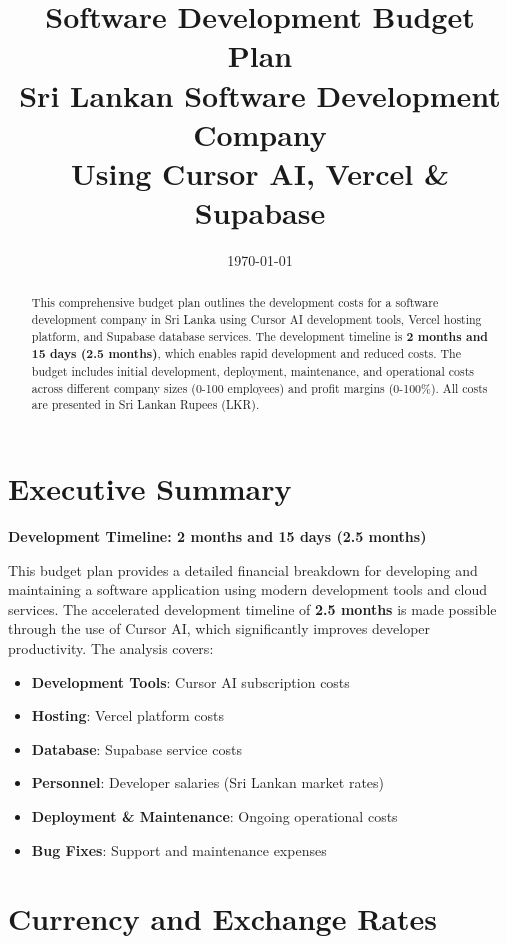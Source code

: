 \documentclass[12pt,a4paper]{article}
\title{\vspace{-2cm}\Huge\textbf{Software Development Budget Plan}\\
\Large Sri Lankan Software Development Company\\
\large Using Cursor AI, Vercel \& Supabase\vspace{0.5cm}}
\author{}
\date{\today}
\begin{document}
\maketitle
\thispagestyle{fancy}

\begin{abstract}
This comprehensive budget plan outlines the development costs for a software development company in Sri Lanka using Cursor AI development tools, Vercel hosting platform, and Supabase database services. The development timeline is \textbf{2 months and 15 days (2.5 months)}, which enables rapid development and reduced costs. The budget includes initial development, deployment, maintenance, and operational costs across different company sizes (0-100 employees) and profit margins (0-100\%). All costs are presented in Sri Lankan Rupees (LKR).
\end{abstract}

\tableofcontents
\newpage

\section{Executive Summary}

\textbf{Development Timeline: 2 months and 15 days (2.5 months)}

This budget plan provides a detailed financial breakdown for developing and maintaining a software application using modern development tools and cloud services. The accelerated development timeline of \textbf{2.5 months} is made possible through the use of Cursor AI, which significantly improves developer productivity. The analysis covers:

\begin{itemize}
    \item \textbf{Development Tools}: Cursor AI subscription costs
    \item \textbf{Hosting}: Vercel platform costs
    \item \textbf{Database}: Supabase service costs
    \item \textbf{Personnel}: Developer salaries (Sri Lankan market rates)
    \item \textbf{Deployment \& Maintenance}: Ongoing operational costs
    \item \textbf{Bug Fixes}: Support and maintenance expenses
\end{itemize}

\section{Currency and Exchange Rates}
\end{document}
